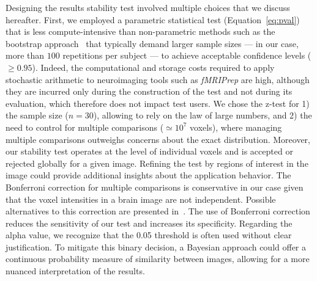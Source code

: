\documentclass[lettersize,journal]{IEEEtran}
\newcommand{\fmriprep}{\emph{fMRIPrep}\xspace}
\newcommand{\add}[1]{\textcolor{green!60!black}{#1}} %
\begin{document}
Designing the results stability test involved multiple choices that we discuss
hereafter. First, we employed a parametric statistical test
(Equation~\ref{eq:pval}) that is less compute-intensive than non-parametric
methods \add{such as the bootstrap approach~\cite{zrimvsek2024quantifying}}
that typically demand larger sample sizes --- in our case, more than $100$
repetitions per subject --- to achieve acceptable confidence levels ($\geq
  0.95$). Indeed, the computational and storage costs required to apply
stochastic arithmetic to neuroimaging tools such as \fmriprep are high,
although they are incurred only during the construction of the test and not
during its evaluation, which therefore does not impact test users. \add{We
  chose the z-test for 1) the sample size ($n = 30$), allowing to rely on the law
  of large numbers, and 2) the need to control for multiple comparisons
  ($\simeq10^7$ voxels), where managing multiple comparisons outweighs concerns
  about the exact distribution.} Moreover, our stability test operates at the
level of individual voxels and is accepted or rejected globally for a given
image. Refining the test by regions of interest in the image could provide
additional insights about the application behavior. The Bonferroni correction
for multiple comparisons is conservative in our case given that the voxel
intensities in a brain image are not independent. Possible alternatives to this
correction are presented in~\cite{NICHOLS2007246}. The use of Bonferroni
correction reduces the sensitivity of our test and increases its specificity.
\add{Regarding the alpha value, we recognize that the 0.05 threshold is often
  used without clear justification. To mitigate this binary decision, a Bayesian
  approach could offer a continuous probability measure of similarity between
  images, allowing for a more nuanced interpretation of the results.}
\end{document}

